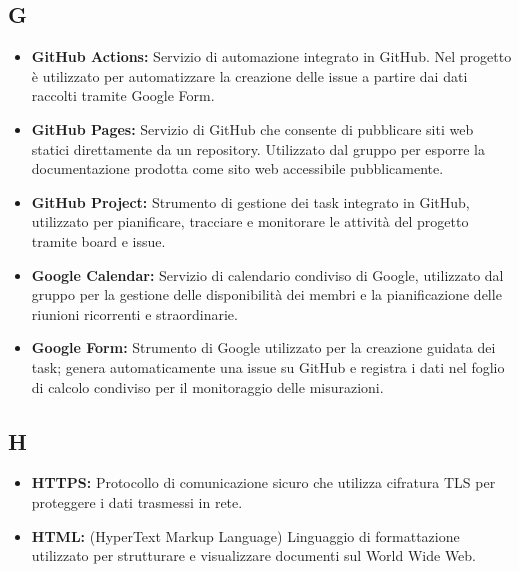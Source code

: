 {}
\subsection*{G}
\begin{itemize}[leftmargin=*]
      \item \textbf{GitHub Actions:} Servizio di automazione integrato in GitHub. Nel progetto è utilizzato per automatizzare la creazione delle issue a partire dai dati raccolti tramite Google Form.
      \item \textbf{GitHub Pages:} Servizio di GitHub che consente di pubblicare siti
            web statici direttamente da un repository. Utilizzato dal gruppo per
            esporre la documentazione prodotta come sito web accessibile pubblicamente.
      \item \textbf{GitHub Project:} Strumento di gestione dei task integrato in
            GitHub, utilizzato per pianificare, tracciare e monitorare le attività
            del progetto tramite board e issue.
      \item \textbf{Google Calendar:} Servizio di calendario condiviso di Google,
            utilizzato dal gruppo per la gestione delle disponibilità dei membri e
            la pianificazione delle riunioni ricorrenti e straordinarie.
      \item \textbf{Google Form:} Strumento di Google utilizzato per la creazione
          guidata dei task; genera automaticamente una issue su GitHub e registra
          i dati nel foglio di calcolo condiviso per il monitoraggio delle
          misurazioni.
\end{itemize}
 
{}
\subsection*{H}
\begin{itemize}[leftmargin=*]
      \item \textbf{HTTPS:} Protocollo di comunicazione sicuro che utilizza cifratura TLS per proteggere i dati trasmessi in rete.
      \item \textbf{HTML:} (HyperText Markup Language) Linguaggio di formattazione utilizzato per strutturare e visualizzare documenti sul World Wide Web.
\end{itemize}
 
{}
